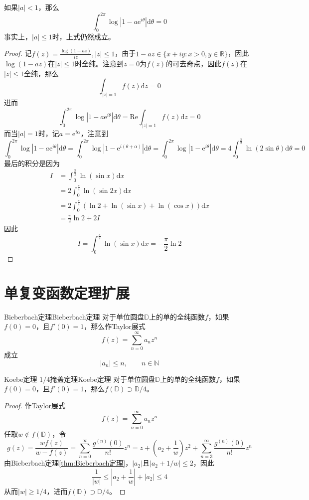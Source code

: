 \documentclass[lang = cn, scheme = chinese, thmcnt = section]{elegantbook}
\newcommand{\N}{\mathbb{N}}            %
\newcommand{\R}{\mathbb{R}}            %
\begin{document}
\begin{proposition}
	如果$|a|<1$，那么
	$$
	\int_0^{2\pi} \log |1-a\mathrm{e}^{i\theta}|\mathrm{d}\theta=0
	$$
	事实上，$|a|\le 1$时，上式仍然成立。
\end{proposition}

\begin{proof}
	记$f(z)=\frac{\log(1-az)}{iz},|z|\le1$，由于$1-az\in\{ x+iy:x>0,y\in\R \}$，因此$\log(1-az)$在$|z|\le 1$时全纯。注意到$z=0$为$f(z)$的可去奇点，因此$f(z)$在$|z|\le 1$全纯，那么
	$$
	\int_{|z|=1}f(z)\mathrm{d}z=0
	$$
	进而
	$$
	\int_0^{2\pi} \log |1-a\mathrm{e}^{i\theta}|\mathrm{d}\theta=\text{Re}\int_{|z|=1}f(z)\mathrm{d}z=0
	$$
	而当$|a|=1$时，记$a=\mathrm{e}^{i\alpha}$​，注意到
	$$
	\int_0^{2\pi} \log |1-a\mathrm{e}^{i\theta}|\mathrm{d}\theta=
	\int_0^{2\pi} \log |1-\mathrm{e}^{i(\theta+\alpha)}|\mathrm{d}\theta=
	\int_0^{2\pi} \log |1-\mathrm{e}^{i\theta}|\mathrm{d}\theta=
	4\int_0^{\frac{\pi}{2}}\ln(2\sin\theta)\mathrm{d}\theta=0
	$$
	最后的积分是因为
	\begin{align*}
		I&=\int_0^{\frac{\pi}{2}}\ln(\sin x)\mathrm{d}x\\
		&=2\int_0^{\frac{\pi}{4}}\ln(\sin 2x)\mathrm{d}x\\
		&=2\int_0^{\frac{\pi}{4}}(\ln2+\ln(\sin x)+\ln(\cos x))\mathrm{d}x\\
		&=\frac{\pi}{2}\ln 2+2I
	\end{align*}
	因此
	$$
	I=\int_0^{\frac{\pi}{2}}\ln(\sin x)\mathrm{d}x=-\frac{\pi}{2}\ln 2
	$$
\end{proof}

\appendix

\chapter{单复变函数定理扩展}

\begin{theorem}{Bieberbach定理}{Bieberbach定理}
	对于单位圆盘$\mathbb{D}$上的单的全纯函数$f$，如果$f(0)=0$，且$f'(0)=1$，那么作Taylor展式%
	$$
	f(z)=\sum_{n=0}^{\infty}a_nz^n
	$$
	成立%
	$$
	|a_n|\le n,\qquad n\in\N
	$$
\end{theorem}

\begin{theorem}{Koebe定理 $1/4$掩盖定理}{Koebe定理}
	对于单位圆盘$\mathbb{D}$上的单的全纯函数$f$，如果$f(0)=0$，且$f'(0)=1$，那么$f(\mathbb{D})\supset\mathbb{D}/4$。
\end{theorem}

\begin{proof}
	作Taylor展式%
	$$
	f(z)=\sum_{n=0}^{\infty}a_nz^n
	$$
	任取$w\notin f(\mathbb{D})$，令%
	$$
	g(z)
	=\frac{wf(z)}{w-f(z)}
	=\sum_{n=0}^{\infty}\frac{g^{(n)}(0)}{n!}z^n
	=z+\left(a_2+\frac{1}{w}\right)z^2+\sum_{n=3}^{\infty}\frac{g^{(n)}(0)}{n!}z^n
	$$
	由Bieberbach定理\ref{thm:Bieberbach定理}，$|a_2|$且$|a_2+1/w|\le 2$，因此%
	$$
	\frac{1}{|w|}
	\le\left|a_2+\frac{1}{w}\right|+|a_2|
	\le 4
	$$
	从而$|w|\ge 1/4$，进而$f(\mathbb{D})\supset\mathbb{D}/4$。
\end{proof}
\end{document}
